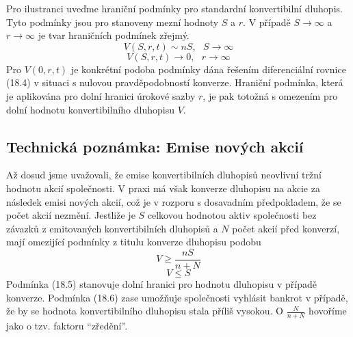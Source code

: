 \documentclass[a4paper]{book}
\begin{document}
Pro ilustranci uveďme hraniční podmínky pro standardní konvertibilní dluhopis. Tyto podmínky jsou pro stanoveny mezní hodnoty $S$ a $r$. V případě $S \rightarrow \infty$ a $r \rightarrow \infty$ je tvar hraničních podmínek zřejmý.
\begin{equation*}
V(S,r,t) \sim nS, ~~~ S \rightarrow \infty
\end{equation*}
\begin{equation*}
V(S,r,t) \rightarrow 0, ~~~ r \rightarrow \infty
\end{equation*}
Pro $V(0,r,t)$ je konkrétní podoba podmínky dána řešením diferenciální rovnice (18.4) v situaci s nulovou pravděpodobností konverze. Hraniční podmínka, která je aplikována pro dolní hranici úrokové sazby $r$, je pak totožná s omezením pro dolní hodnotu konvertibilního dluhopisu $V$.

\subsection{Technická poznámka: Emise nových akcií}

Až dosud jsme uvažovali, že emise konvertibilních dluhopisů neovlivní tržní hodnotu akcií společnosti. V praxi má však konverze dluhopisu na akcie za následek emisi nových akcií, což je v rozporu s dosavadním předpokladem, že se počet akcií nezmění. Jestliže je $S$ celkovou hodnotou aktiv společnosti bez závazků z emitovaných konvertibilních dluhopisů a $N$ počet akcií před konverzí, mají omezijící podmínky z titulu konverze dluhopisu podobu
\begin{equation}
V \ge \frac{nS}{n + N}
\end{equation}
\begin{equation}
V \le S
\end{equation}
Podmínka (18.5) stanovuje dolní hranici pro hodnotu dluhopisu v případě konverze. Podmínka (18.6) zase umožňuje společnosti vyhlásit bankrot v případě, že by se hodnota konvertibilního dluhopisu stala příliš vysokou. O $\frac{N}{n + N}$ hovoříme jako o tzv. faktoru ``zředění''.
\end{document}
